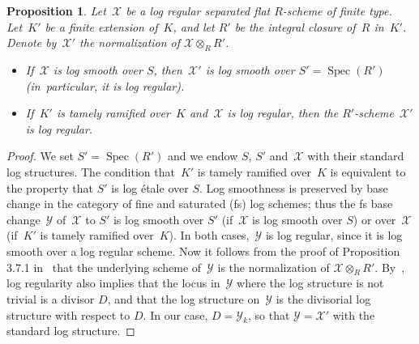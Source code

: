 \documentclass[JEP,XML,SOM,Unicode,NoFloatCountersInSection]{cedram}
\newtheorem{prop}[equation]{Proposition}
\theoremstyle{definition}
\numberwithin{equation}{subsection}
\newcommand{\cX}{\ensuremath{\mathscr{X}}}
\newcommand{\cY}{\ensuremath{\mathscr{Y}}}
\DeclareMathOperator{\Spec}{Spec}
\begin{document}
\begin{prop}\label{prop:logreg}
Let~$\cX$ be a log regular separated flat $R$\nobreakdash-scheme of finite type.
Let~$K'$ be a finite extension of~$K$, and let $R'$ be the integral closure of~$R$ in~$K'$. Denote by~$\cX'$ the normalization of $\cX\otimes_R R'$.
\begin{itemize}
\item[(i)]
If~$\cX$ is log smooth over $S$, then~$\cX'$ is log smooth over $S'=\Spec(R')$ (in~particular, it is log regular).
\item[(ii)]
If~$K'$ is tamely ramified over~$K$ and~$\cX$ is log regular, then the $R'$-scheme~$\cX'$ is log regular.
\end{itemize}
\end{prop}
\begin{proof}
We set $S'=\Spec(R')$ and we endow $S$, $S'$ and~$\cX$ with their standard log structures. The condition that~$K'$ is tamely ramified over~$K$ is equivalent to the property that $S'$ is log étale over $S$.
Log smoothness is preserved by base change in the category of fine and saturated (fs) log schemes; thus the fs base change~$\cY$ of~$\cX$ to $S'$ is log smooth over $S'$ (if~$\cX$ is log smooth over $S$) or over~$\cX$ (if~$K'$ is tamely ramified over~$K$). In both cases,~$\cY$ is log regular, since it is log smooth over a log regular scheme.
Now it follows from the proof of Proposition 3.7.1 in~\cite{logzeta} that the underlying scheme of~$\cY$ is the normalization of $\cX\otimes_R R'$.
By~\cite[11.6]{kato}, log regularity also implies that the locus in~$\cY$ where the log structure is not trivial is a divisor $D$, and that the log structure on~$\cY$ is the divisorial log structure with respect to $D$. In our case, $D=\cY_k$, so that $\cY=\cX'$ with the standard log structure.
\end{proof}
\end{document}
